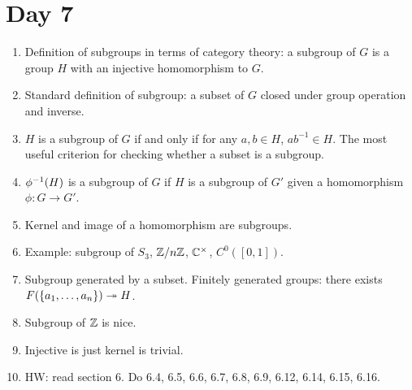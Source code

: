 \documentclass[12pt]{scrartcl}
\begin{document}
\section{Day 7}
\begin{enumerate}
    \item Definition of subgroups in terms of category theory: a subgroup of $G$ is a group $H$ with an injective homomorphism to $G$.
    \item Standard definition of subgroup: a subset of $G$ closed under group operation and inverse.
    \item $H$ is a subgroup of $G$ if and only if for any $a,b\in H$, $ab^{-1}\in H$. The most useful criterion for checking whether a subset is a subgroup.
    \item $\phi^{-1}(H)$ is a subgroup of $G$ if $H$ is a subgroup of $G'$ given a homomorphism $\phi:G\to G'$.
    \item Kernel and image of a homomorphism are subgroups.
    \item Example: subgroup of $S_3$,  $\mathbb Z/n\mathbb Z$, $\mathbb C^\times$, $C^0([0,1])$.
    \item Subgroup generated by a subset. Finitely generated groups: there exists $F(\{a_1, \ldots, a_n\})\twoheadrightarrow H$.
    \item Subgroup of $\mathbb Z$ is nice. 
    \item Injective is just kernel is trivial.
    \item HW: read section 6. Do 6.4, 6.5, 6.6, 6.7, 6.8, 6.9, 6.12, 6.14, 6.15, 6.16. 
\end{enumerate}
\end{document}
